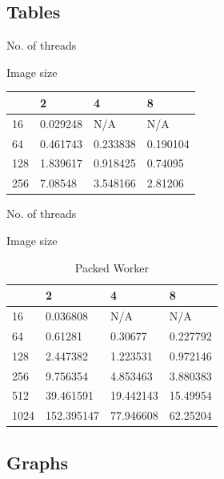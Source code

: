 \documentclass[11pt, oneside]{article}
\begin{document}
\vspace{-4mm}
\subsection{Tables}
\vspace{-3mm}

\begin{center}
No. of threads
\end{center}

\begin{table}[!th]
\centering
Image size
\begin{tabular}{l|lll}
    & 2        & 4        & 8        \\ \hline
16  & 0.029248 & N/A      & N/A      \\
64  & 0.461743 & 0.233838 & 0.190104 \\
128 & 1.839617 & 0.918425 & 0.74095  \\
256 & 7.08548  & 3.548166 & 2.81206 
\end{tabular}
\end{table}

\vspace{4mm}

\begin{center}
No. of threads
\end{center}

\begin{table}[!th]
\centering
\label{my-label}
Image size
\begin{tabular}{l|lll}
    & 2          & 4         & 8        \\ \hline
16   & 0.036808   & N/A       & N/A      \\
64   & 0.61281    & 0.30677   & 0.227792 \\
128  & 2.447382   & 1.223531  & 0.972146 \\
256  & 9.756354   & 4.853463  & 3.880383 \\
512  & 39.461591  & 19.442143 & 15.49954 \\
1024 & 152.395147 & 77.946608 & 62.25204
\end{tabular}
\caption{Packed Worker}
\end{table}

\pagebreak
\subsection{Graphs}
\end{document}
